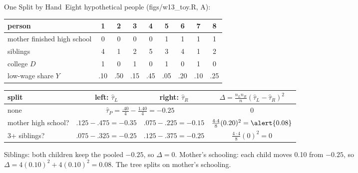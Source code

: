 \documentclass[aspectratio=169,11pt,xcolor=dvipsnames]{beamer}
\newcommand{\srcp}[1]{{\scriptsize\color{gray}(#1)}}
\newcommand{\core}{\,\raisebox{0.6pt}{\textcolor{corestar}{$\bigstar$}}}
\begin{document}
\begin{frame}{One Split by Hand\core}
Eight hypothetical people \srcp{figs/w13\_toy.R, A}:
\begin{center}\small
\renewcommand{\arraystretch}{1.05}
\begin{tabular}{@{}lcccccccc@{}}
\toprule
person & 1 & 2 & 3 & 4 & 5 & 6 & 7 & 8 \\
\midrule
mother finished high school & 0 & 0 & 0 & 0 & 1 & 1 & 1 & 1 \\
siblings & 4 & 1 & 2 & 5 & 3 & 4 & 1 & 2 \\
college $D$ & 1 & 0 & 1 & 0 & 1 & 0 & 1 & 0 \\
low-wage share $Y$ & .10 & .50 & .15 & .45 & .05 & .20 & .10 & .25 \\
\bottomrule
\end{tabular}
\end{center}
\begin{center}\small
\renewcommand{\arraystretch}{1.05}
\begin{tabular}{@{}lccc@{}}
\toprule
split & left: $\hat\tau_L$ & right: $\hat\tau_R$ & $\Delta = \frac{n_L n_R}{n}(\hat\tau_L - \hat\tau_R)^2$ \\
\midrule
none & \multicolumn{2}{c}{$\hat\tau_P = \tfrac{.40}{4} - \tfrac{1.40}{4} = -0.25$} & 0 \\
mother high school? & $.125 - .475 = -0.35$ & $.075 - .225 = -0.15$ & $\tfrac{4\cdot4}{8}(0.20)^2 = \alert{0.08}$ \\
3+ siblings? & $.075 - .325 = -0.25$ & $.125 - .375 = -0.25$ & $\tfrac{4\cdot4}{8}(0)^2 = 0$ \\
\bottomrule
\end{tabular}
\end{center}
{\small Siblings: both children keep the pooled $-0.25$, so $\Delta = 0$. Mother's schooling: each child moves
0.10 from $-0.25$, so $\Delta = 4(0.10)^2 + 4(0.10)^2 = 0.08$. The tree splits on mother's schooling.}
\end{frame}
\end{document}
